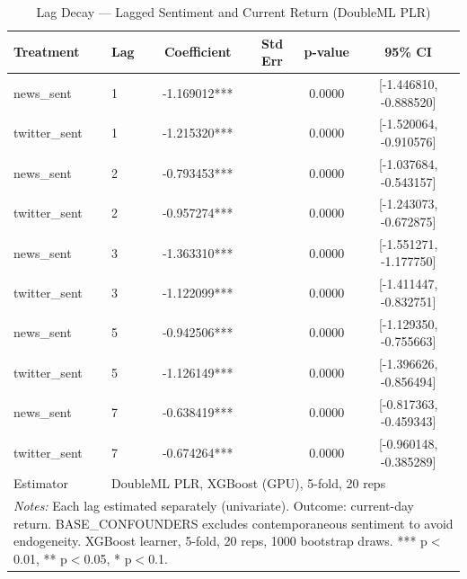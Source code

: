 \begin{table}[htbp]
\centering
\caption{Lag Decay --- Lagged Sentiment and Current Return (DoubleML PLR)}
\begin{tabular}{llcccc}
\hline\hline
Treatment & Lag & Coefficient & Std Err & p-value & 95\% CI \\
\hline
news\_sent & 1 & -1.169012*** &  & 0.0000 & [-1.446810, -0.888520] \\
twitter\_sent & 1 & -1.215320*** &  & 0.0000 & [-1.520064, -0.910576] \\
news\_sent & 2 & -0.793453*** &  & 0.0000 & [-1.037684, -0.543157] \\
twitter\_sent & 2 & -0.957274*** &  & 0.0000 & [-1.243073, -0.672875] \\
news\_sent & 3 & -1.363310*** &  & 0.0000 & [-1.551271, -1.177750] \\
twitter\_sent & 3 & -1.122099*** &  & 0.0000 & [-1.411447, -0.832751] \\
news\_sent & 5 & -0.942506*** &  & 0.0000 & [-1.129350, -0.755663] \\
twitter\_sent & 5 & -1.126149*** &  & 0.0000 & [-1.396626, -0.856494] \\
news\_sent & 7 & -0.638419*** &  & 0.0000 & [-0.817363, -0.459343] \\
twitter\_sent & 7 & -0.674264*** &  & 0.0000 & [-0.960148, -0.385289] \\
\hline
Estimator & \multicolumn{5}{l}{DoubleML PLR, XGBoost (GPU), 5-fold, 20 reps} \\
\hline\hline
\multicolumn{6}{l}{\footnotesize \textit{Notes:} Each lag estimated separately (univariate). Outcome: current-day return. BASE\_CONFOUNDERS excludes contemporaneous sentiment to avoid endogeneity. XGBoost learner, 5-fold, 20 reps, 1000 bootstrap draws. *** p$<$0.01, ** p$<$0.05, * p$<$0.1.} \\
\end{tabular}
\end{table}